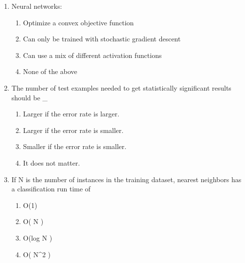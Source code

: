 \documentclass[{\csname fa0013Font0\endcsname\char"0032}{\csname fa0014Font0\endcsname\char"0031}pt]{article}
\begin{document}
\begin{enumerate}[label=\arabic*.]
\begin{enumerate}[label=(\alph*)]
    \item {\csname fa0019Font0\endcsname\char"0063}{\char"0072}{\csname fa0019Font2\endcsname\char"006F}{\csname fa0019Font3\endcsname\char"0073}{\csname fa0019Font4\endcsname\char"0073}{\char"002D}{\csname fa0019Font6\endcsname\char"0076}{\csname fa0019Font7\endcsname\char"0061}{\csname fa0019Font8\endcsname\char"006C}{\csname fa0019Font9\endcsname\char"0069}{\csname fa0019Font10\endcsname\char"0064}{\csname fa0019Font11\endcsname\char"0061}{\csname fa0019Font12\endcsname\char"0074}{\csname fa0019Font13\endcsname\char"0069}{\csname fa0019Font14\endcsname\char"006F}{\csname fa0019Font15\endcsname\char"006E} mismatch robustness
    \item {\csname fa0020Font0\endcsname\char"0066}{\csname fa0020Font1\endcsname\char"006F}{\csname fa0020Font2\endcsname\char"0072}{\csname fa0020Font3\endcsname\char"0065}{\char"0067}{\char"0072}{\char"006F}{\char"0075}{\char"006E}{\char"0064} detection
\end{enumerate}
\item Neural networks:
\begin{enumerate}[label=(\alph*)]
    \item Optimize a convex objective function
    \item Can only be trained with stochastic gradient descent
    \item Can use a mix of different activation functions
    \item None of the above
\end{enumerate}
\item The number of test examples needed to get statistically significant results should be \_
\begin{enumerate}[label=(\alph*)]
    \item Larger if the error rate is larger.
    \item Larger if the error rate is smaller.
    \item Smaller if the error rate is smaller.
    \item It does not matter.
\end{enumerate}
\item If N is the number of instances in the training dataset, nearest neighbors has a classification run time of
\begin{enumerate}[label=(\alph*)]
    \item O(1)
    \item O( N )
    \item O(log N )
    \item O( N\^{}2 )

\end{enumerate}
\end{enumerate}
\end{document}
